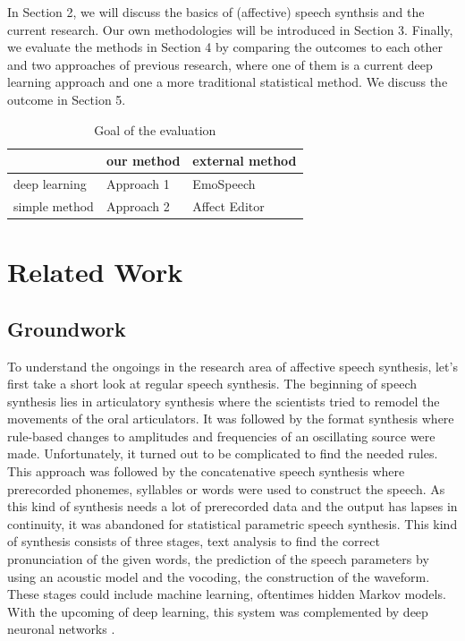 \documentclass[11pt]{article}
\begin{document}
In Section 2, we will discuss the basics of (affective) speech synthsis and the current research. Our own methodologies will be introduced in Section 3. Finally, we evaluate the methods in  Section 4 by comparing the outcomes to each other and two approaches of previous research, where one of them is a current deep learning approach and one a more traditional statistical method. We discuss the outcome in Section 5.

\begin{table}[h]

\vspace{5px}
{
\begin{tabular}{|l|l|l|}
\hline
\rowcolor{gainsboro}&our method&external method\\
\hline
\cellcolor{gainsboro}deep learning&Approach 1&EmoSpeech\\
\hline
\cellcolor{gainsboro}simple method&Approach 2&Affect Editor\\
\hline

\end{tabular}

}
\caption{Goal of the evaluation}
\end{table}


\section{Related Work}
\subsection{Groundwork}
To understand the ongoings in the research area of affective speech synthesis, let’s first take a short look at regular speech synthesis. The beginning of speech synthesis lies in articulatory synthesis where the scientists tried to remodel the movements of the oral articulators. It was followed by the format synthesis where rule-based changes to amplitudes and frequencies of an oscillating source were made. Unfortunately, it turned out to be complicated to find the needed rules. This approach was followed by the concatenative speech synthesis where prerecorded phonemes, syllables or words were used to construct the speech. As this kind of synthesis needs a lot of prerecorded data and the output has lapses in continuity, it was abandoned for statistical parametric speech synthesis. This kind of synthesis consists of three stages, text analysis to find the correct pronunciation of the given words, the prediction of the speech parameters by using an acoustic model and the vocoding, the construction of the waveform. These stages could include machine learning, oftentimes hidden Markov models. With the upcoming of deep learning, this system was complemented by deep neuronal networks \cite{triantafyllopoulos_overview_2023,shen_natural_2018}.
\end{document}

